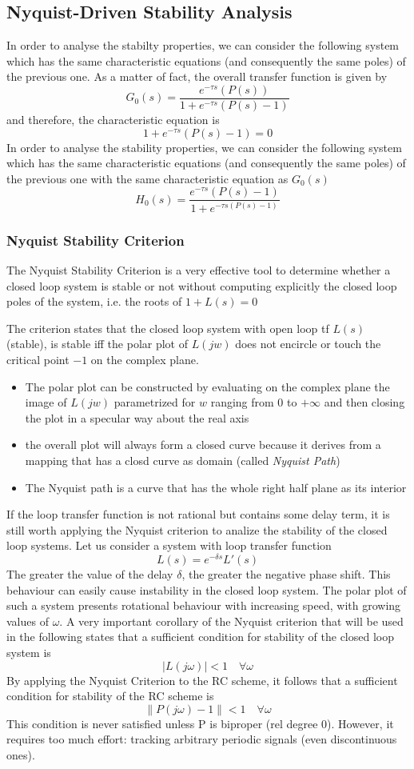 \documentclass{book}
\begin{document}
\subsection{Nyquist-Driven Stability Analysis}
In order to analyse the stabilty properties, we can consider the following system which has the same characteristic equations (and consequently the same poles) of the previous one. As a matter of fact, the overall transfer function is given by 
\[
    G_0(s) = \displaystyle\frac{e^{-\tau s}(P(s)) }{1+e^{-\tau s}(P(s)-1)}
\]
and therefore, the characteristic equation is 
\[
    1+e^{-\tau s}(P(s)-1)=0
\]
In order to analyse the stability properties, we can consider the following system which has the same characteristic equations (and consequently the same poles) of the previous one
with the same characteristic equation as $G_0(s)$ 
\[
    H_0(s) = \displaystyle\frac{e^{-\tau s}(P(s)-1) }{1+e^{-\tau s(P(s)-1)}}
\]
\subsubsection{Nyquist Stability Criterion} 
The Nyquist Stability Criterion is a very effective tool to determine whether a closed loop system is stable or not without computing explicitly the closed loop poles of the system, i.e. the roots of $1+L(s)=0$

The criterion states that the closed loop system with open loop tf $L(s)$ (stable), is stable iff the polar plot of $L(jw)$ does not encircle or touch the critical point $-1$ on the complex plane. 
\begin{itemize}
    \item The polar plot can be constructed by evaluating on the complex plane the image of $L(jw)$ parametrized for $w$ ranging from 0 to $+\infty$ and then closing the plot in a specular way about the real axis 
    \item the overall plot will always form a closed curve because it derives from a mapping that has a closd curve as domain (called \emph{Nyquist Path}) 
    \item The Nyquist path is a curve that has the whole right half plane as its interior
\end{itemize}
If the loop transfer function is not rational but contains some delay term, it is still worth applying the Nyquist criterion to analize the stability of the closed loop systems. Let us consider a system with loop transfer function 
\[
    L(s) = e^{-\delta s} L'(s)
\]
The greater the value of the delay $\delta$, the greater the negative phase shift. This behaviour can easily cause instability in the closed loop system. The polar plot of such a system presents rotational behaviour with increasing speed, with growing values of $\omega$. A very important corollary of the Nyquist criterion that will be used in the following states that a sufficient condition for stability of the closed loop system is 
\[
    |L(j\omega)|<1 \quad \forall \omega
\]
By applying the Nyquist Criterion to the RC scheme, it follows that a sufficient condition for stability of the RC scheme is 
\[
    \|P(j\omega)-1\| < 1 \quad \forall \omega
\]
This condition is never satisfied unless P is biproper (rel degree 0). However, it requires too much effort: tracking arbitrary periodic signals (even discontinuous ones).
\end{document}
